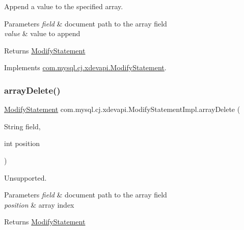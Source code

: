Append a value to the specified array.


\begin{DoxyParams}{Parameters}
{\em field} & document path to the array field \\
\hline
{\em value} & value to append \\
\hline
\end{DoxyParams}
\begin{DoxyReturn}{Returns}
\mbox{\hyperlink{interfacecom_1_1mysql_1_1cj_1_1xdevapi_1_1_modify_statement}{Modify\+Statement}} 
\end{DoxyReturn}


Implements \mbox{\hyperlink{interfacecom_1_1mysql_1_1cj_1_1xdevapi_1_1_modify_statement_a236afae470efde69f0276fe532b16f52}{com.\+mysql.\+cj.\+xdevapi.\+Modify\+Statement}}.

\mbox{\label{classcom_1_1mysql_1_1cj_1_1xdevapi_1_1_modify_statement_impl_ac765892bc25e09147fa11c5171a9287b}} 
\subsubsection{\texorpdfstring{array\+Delete()}{arrayDelete()}}
{\footnotesize\ttfamily \mbox{\hyperlink{interfacecom_1_1mysql_1_1cj_1_1xdevapi_1_1_modify_statement}{Modify\+Statement}} com.\+mysql.\+cj.\+xdevapi.\+Modify\+Statement\+Impl.\+array\+Delete (\begin{DoxyParamCaption}\item[{String}]{field,  }\item[{int}]{position }\end{DoxyParamCaption})}

Unsupported.


\begin{DoxyParams}{Parameters}
{\em field} & document path to the array field \\
\hline
{\em position} & array index \\
\hline
\end{DoxyParams}
\begin{DoxyReturn}{Returns}
\mbox{\hyperlink{interfacecom_1_1mysql_1_1cj_1_1xdevapi_1_1_modify_statement}{Modify\+Statement}} 
\end{DoxyReturn}


